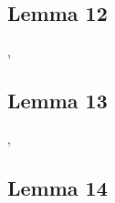 \documentclass[preview]{standalone}
\begin{document}
\subsection[Lemma 12]{\color{section}Lemma 12}

\sep


\subsection[Lemma 13]{\color{section}Lemma 13}

\sep
\pagebreak


\subsection[Lemma 14]{\color{section}Lemma 14}

\pagebreak
\end{document}
